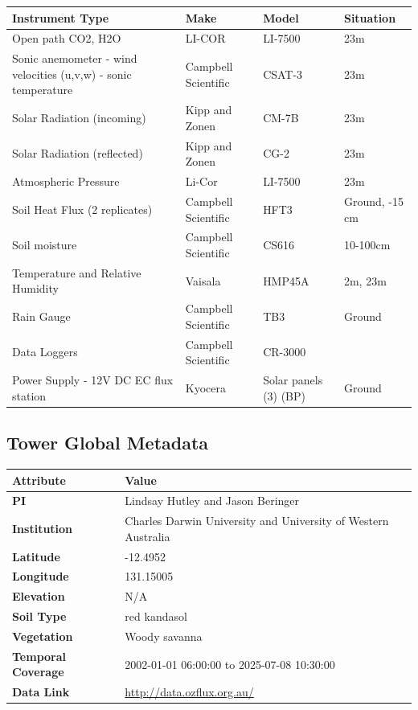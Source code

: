 \documentclass[11pt,a4paper]{article}
\begin{document}
\begin{longtable}{p{4.5cm}p{3.5cm}p{3.5cm}p{3.5cm}}
\toprule
\textbf{Instrument Type} & \textbf{Make} & \textbf{Model} & \textbf{Situation} \\
\midrule
\endhead
\bottomrule
\endfoot
Open path  CO2, H2O & LI-COR & LI-7500 & 23m \\
Sonic anemometer                 - wind velocities (u,v,w)                  - sonic   temperature & Campbell Scientific & CSAT-3 & 23m \\
Solar  Radiation (incoming) & Kipp  and Zonen & CM-7B & 23m \\
Solar  Radiation (reflected) & Kipp  and Zonen & CG-2 & 23m \\
Atmospheric  Pressure & Li-Cor & LI-7500 & 23m \\
Soil Heat Flux (2 replicates) & Campbell Scientific & HFT3 & Ground,  -15 cm \\
Soil moisture & Campbell Scientific & CS616 & 10-100cm \\
Temperature and Relative Humidity & Vaisala & HMP45A & 2m, 23m \\
Rain  Gauge & Campbell Scientific & TB3 & Ground \\
Data Loggers & Campbell Scientific & CR-3000 &  \\
Power Supply                 -                  12V DC EC flux station & Kyocera & Solar  panels (3) (BP) & Ground \\
\end{longtable}


\subsection*{Tower Global Metadata}

\begin{longtable}{p{4.5cm}p{10.5cm}}
\toprule
\textbf{Attribute} & \textbf{Value} \\
\midrule
\endhead
\bottomrule
\endfoot
\textbf{PI} & Lindsay Hutley and Jason Beringer \\
\textbf{Institution} & Charles Darwin University and University of Western Australia \\
\textbf{Latitude} & -12.4952 \\
\textbf{Longitude} & 131.15005 \\
\textbf{Elevation} & N/A \\
\textbf{Soil Type} & red kandasol \\
\textbf{Vegetation} & Woody savanna \\
\textbf{Temporal Coverage} & 2002-01-01 06:00:00 to 2025-07-08 10:30:00 \\
\textbf{Data Link} & \url{http://data.ozflux.org.au/} \\
\end{longtable}
\end{document}
